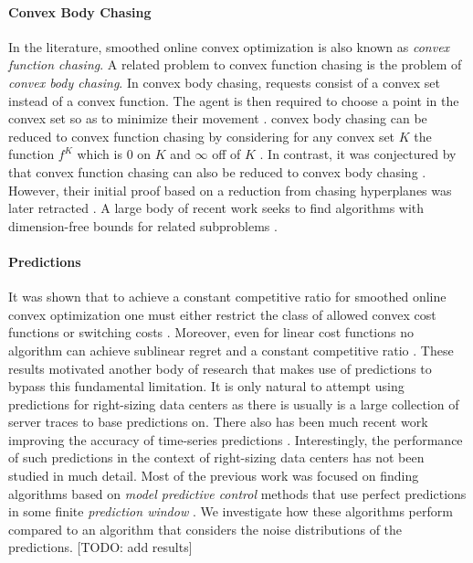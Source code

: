 \paragraph{Convex Body Chasing} In the literature, smoothed online convex optimization is also known as \emph{convex function chasing}. A related problem to convex function chasing is the problem of \emph{convex body chasing}. In convex body chasing, requests consist of a convex set instead of a convex function. The agent is then required to choose a point in the convex set so as to minimize their movement \cite{Antoniadis2016}. convex body chasing can be reduced to convex function chasing by considering for any convex set $K$ the function $f^K$ which is 0 on $K$ and $\infty$ off of $K$ \cite{Sellke2019}. In contrast, it was conjectured by \citeauthor*{Antoniadis2016} that convex function chasing can also be reduced to convex body chasing \cite{Antoniadis2016}. However, their initial proof based on a reduction from chasing hyperplanes was later retracted \cite{Pruhs2021}. A large body of recent work seeks to find algorithms with dimension-free bounds for related subproblems \cite{Bubeck2018, Bubeck2018_2, Argue2019, Argue2020}.

\paragraph{Predictions} It was shown that to achieve a constant competitive ratio for smoothed online convex optimization one must either restrict the class of allowed convex cost functions or switching costs \cite{Chen2018}. Moreover, even for linear cost functions no algorithm can achieve sublinear regret and a constant competitive ratio \cite{Andrew2015}. These results motivated another body of research that makes use of predictions to bypass this fundamental limitation. It is only natural to attempt using predictions for right-sizing data centers as there is usually is a large collection of server traces to base predictions on. There also has been much recent work improving the accuracy of time-series predictions \cite{Taylor2017, Benidis2020, Chen2020, Hosseini2021}. Interestingly, the performance of such predictions in the context of right-sizing data centers has not been studied in much detail. Most of the previous work was focused on finding algorithms based on \emph{model predictive control} methods that use perfect predictions in some finite \emph{prediction window} \cite{Lin2012, Chen2015, Badiei2015, Chen2016, Li2018, Lin2019}. We investigate how these algorithms perform compared to an algorithm that considers the noise distributions of the predictions. [TODO: add results]

